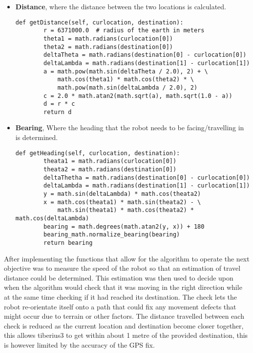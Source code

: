 \begin{itemize}
\item \textbf{Distance}, where the distance between the two locations is calculated.
\begin{lstlisting}[style=custompython, label=Distance-equation, caption=Equation for the distance between two points]
def getDistance(self, curlocation, destination):
        r = 6371000.0  # radius of the earth in meters
        theta1 = math.radians(curlocation[0])
        theta2 = math.radians(destination[0])
        deltaTheta = math.radians(destination[0] - curlocation[0])
        deltaLambda = math.radians(destination[1] - curlocation[1])
        a = math.pow(math.sin(deltaTheta / 2.0), 2) + \
            math.cos(theta1) * math.cos(theta2) * \
            math.pow(math.sin(deltaLambda / 2.0), 2)
        c = 2.0 * math.atan2(math.sqrt(a), math.sqrt(1.0 - a))
        d = r * c
        return d
\end{lstlisting}
\item \textbf{Bearing}, Where the heading that the robot needs to be facing/travelling in is determined.
\begin{lstlisting}[style=custompython, label=Bearing-equation, caption=Equation for the bearing needed to travel from one point to another]
def getHeading(self, curlocation, destination):
        theata1 = math.radians(curlocation[0])
        theata2 = math.radians(destination[0])
        deltaThetha = math.radians(destination[0] - curlocation[0])
        deltaLambda = math.radians(destination[1] - curlocation[1])
        y = math.sin(deltaLambda) * math.cos(theata2)
        x = math.cos(theata1) * math.sin(theata2) - \
            math.sin(theata1) * math.cos(theata2) * math.cos(deltaLambda)
        bearing = math.degrees(math.atan2(y, x)) + 180
        bearing_math.normalize_bearing(bearing)
        return bearing
\end{lstlisting}

\end{itemize}
After implementing the functions that allow for the algorithm to operate the next objective was to measure the speed of the robot so that an estimation of travel distance could be determined. This estimation was then used to decide upon when the algorithm would check that it was moving in the right direction while at the same time checking if it had reached its destination. The check lets the robot re-orientate itself onto a path that could fix any movement defects that might occur due to terrain or other factors. The distance travelled between each check is reduced as the current location and destination become closer together, this allows \gls{tiberius3} to get within about 1 metre of the provided destination, this is however limited by the accuracy of the \gls{GPS} fix.

